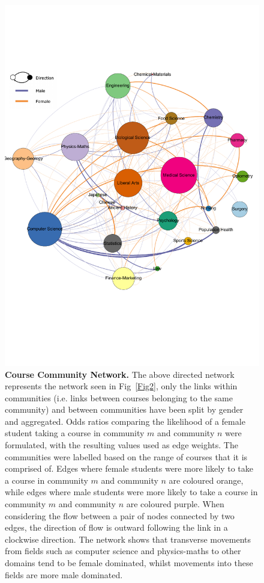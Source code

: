 \begin{figure}[!ht]
\centering
 \includegraphics[width = \linewidth]{C3 - Bourdieu Networks/C3 - Fig3.pdf}
\caption{\textbf{Course Community Network.\newline} 
The above directed network represents the network seen in Fig~\ref{Fig2}, only the links within communities (i.e. links between courses belonging to the same community) and between communities have been split by gender and aggregated. Odds ratios comparing the likelihood of a female student taking a course in community $m$ and community $n$ were formulated, with the resulting values used as edge weights. The communities were labelled based on the range of courses that it is comprised of. Edges where female students were more likely to take a course in community $m$ and community $n$ are coloured orange, while edges where male students were more likely to take a course in community $m$ and community $n$ are coloured purple. When considering the flow between a pair of nodes connected by two edges, the direction of flow is outward following the link in a clockwise direction. The network shows that transverse movements from fields such as computer science and physics-maths to other domains tend to be female dominated, whilst movements into these fields are more male dominated.}
\label{Fig3}
\end{figure}


